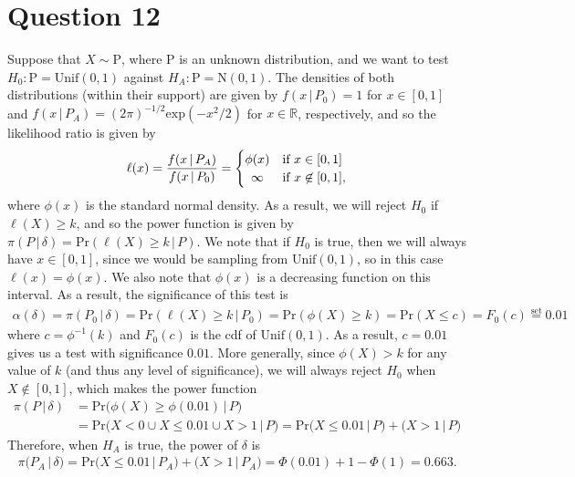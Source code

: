 \documentclass[10pt]{article}
\begin{document}
\section{Question 12} \noindent
Suppose that \(X \sim \mathrm{P}\), where \(\mathrm{P}\) is an unknown distribution, and we want to test \(H_0: \mathrm{P} = \mathrm{Unif}(0,1)\) against 
\(H_A: \mathrm{P} = \mathrm{N}(0, 1)\). The densities of both distributions (within their support) are given by \(f(x \,|\, P_0) = 1\) for \(x \in [0,1]\) and 
\(f(x \,|\, P_A) = (2\pi)^{-1/2}\mathrm{exp}(-x^2 / 2)\) for \(x \in \mathbb{R}\), respectively, and so the likelihood ratio is given by 
\begin{align*}
    \ell(x)
    = \frac{f(x \,|\, P_A)}{f(x \,|\, P_0)}
    = \begin{cases}
        \phi(x) & \text{if } x \in [0,1] \\
        \hfil \infty  & \text{if } x \not \in [0,1],
    \end{cases}
\end{align*}
where \(\phi(x)\) is the standard normal density. As a result, we will reject \(H_0\) if \(\ell(X) \ge k\), and so the power function is given by 
\(\pi(P \,|\, \delta) = \mathrm{Pr}(\ell(X) \ge k \,|\, P)\). We note that if \(H_0\) is true, then we will always have \(x \in [0,1]\), since 
we would be sampling from \(\mathrm{Unif}(0,1)\), so in this case \(\ell(x) = \phi(x)\). 
We also note that \(\phi(x)\) is a decreasing function on this interval. As a result, the significance of this test is 
\begin{align*}
    \alpha(\delta)
    = \pi(P_0 \,|\, \delta)
    = \mathrm{Pr}(\ell(X) \ge k \,|\, P_0)
    = \mathrm{Pr}(\phi(X) \ge k)
    = \mathrm{Pr}(X \le c)
    = F_0(c)
    \overset{\mathrm{set}}{=} 0.01
\end{align*}
where \(c = \phi^{-1}(k)\) and \(F_0(c)\) is the cdf of \(\mathrm{Unif}(0,1)\). As a result, \(c = 0.01\) gives us a test with significance \(0.01\). 
More generally, since \(\phi(X) > k\) for any value of \(k\) (and thus any level of significance), we will always reject \(H_0\) when \(X \not \in [0,1]\), 
which makes the power function 
\begin{align*}
    \pi(P \,|\, \delta)
    &= \mathrm{Pr}\big(\phi(X) \ge \phi(0.01) \,|\, P\big) \\
    &= \mathrm{Pr}\big(X < 0 \cup X \le 0.01 \cup X > 1 \,|\, P\big)
    = \mathrm{Pr} \big( X \le 0.01 \,|\, P \big) + \big( X > 1 \,|\, P \big)
\end{align*}
Therefore, when \(H_A\) is true, the power of \(\delta\) is 
\begin{align*}
    \pi(P_A \,|\, \delta)
    = \mathrm{Pr} \big( X \le 0.01 \,|\, P_A \big) + \big( X > 1 \,|\, P_A \big)
    = \Phi(0.01) + 1 - \Phi(1)
    = 0.663.
\end{align*}
\end{document}
